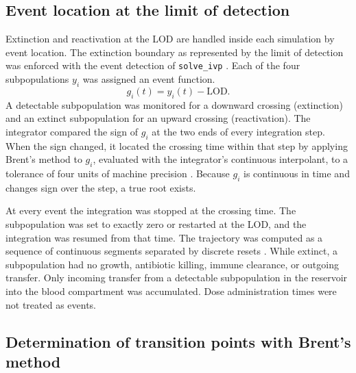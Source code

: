 \documentclass[journal]{IEEEtran}
\begin{document}
\subsection{Event location at the limit of detection}
\label{sec:event-location}

Extinction and reactivation at the LOD are handled inside each simulation by
event location. The extinction boundary as represented by the limit of detection was enforced with the event detection of
\texttt{solve\_ivp} \cite{2020SciPy-NMeth}. Each of the four subpopulations
$y_i$ was assigned an event function.
\begin{equation}
    g_i(t) = y_i(t) - \mathrm{LOD}.
    \label{eq:lod-event}
\end{equation}
A detectable
subpopulation was monitored for a downward crossing (extinction) and an
extinct subpopulation for an upward crossing (reactivation). The integrator
compared the sign of $g_i$ at the two ends of every integration step. When the
sign changed, it located the crossing time within that step by applying
Brent's method to $g_i$, evaluated with the integrator's continuous
interpolant, to a tolerance of four units of machine precision
\cite{scipy_docs,WolframEventDetection}. Because $g_i$ is continuous in time
and changes sign over the step, a true root exists.

At every event the integration was stopped at the crossing time.
The subpopulation
was set to exactly zero or restarted at the LOD, and the integration was
resumed from that time.  The trajectory was computed as a sequence of
continuous segments separated by discrete resets
\cite{Enright1988,ShampineThompson2000}. While extinct, a subpopulation had no growth, antibiotic
killing, immune clearance, or outgoing transfer.  Only incoming transfer from
a detectable subpopulation in the reservoir into the blood compartment was accumulated. Dose administration times were not
treated as events.

\subsection{Determination of transition points with Brent's method}
\label{sec:transition}
\end{document}
